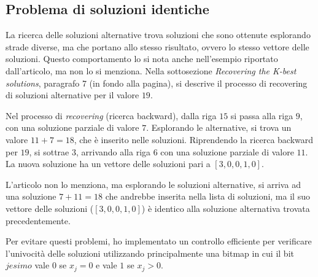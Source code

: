 \subsection{Problema di soluzioni identiche}

La ricerca delle soluzioni alternative trova soluzioni che sono ottenute
esplorando strade diverse, ma che portano allo stesso risultato, ovvero lo
stesso vettore delle soluzioni. Questo comportamento lo si nota anche
nell'esempio riportato dall'articolo, ma non lo si menziona. Nella sottosezione
\emph{Recovering the K-best solutions}, paragrafo 7 (in fondo alla pagina), si
descrive il processo di recovering di soluzioni alternative per il valore $19$.

Nel processo di \emph{recovering} (ricerca backward), dalla riga $15$ si passa
alla riga $9$, con una soluzione parziale di valore $7$. Esplorando le
alternative, si trova un valore $11+7 = 18$, che è inserito nelle soluzioni.
Riprendendo la ricerca backward per $19$, si sottrae $3$, arrivando alla riga
$6$ con una soluzione parziale di valore $11$. La nuova soluzione ha un vettore
delle soluzioni pari a $[3,0,0,1,0]$.

L'articolo non lo menziona, ma esplorando le soluzioni alternative, si arriva
ad una soluzione $7 + 11=18$ che andrebbe inserita nella lista di soluzioni, ma
il suo vettore delle soluzioni ($[3,0,0,1,0]$) è identico alla soluzione
alternativa trovata precedentemente.

Per evitare questi problemi, ho implementato un controllo efficiente per
verificare l'univocità delle soluzioni utilizzando principalmente una bitmap in
cui il bit $jesimo$ vale $0$ se $x_j=0$ e vale $1$ se $x_j > 0$.
